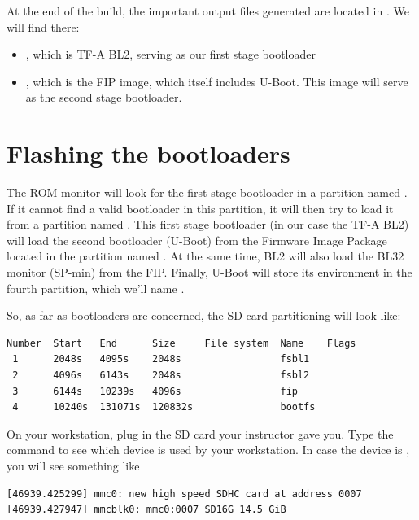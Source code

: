At the end of the build, the important output files generated are
located in . We will find there:

\begin{itemize}

\item {}, which is TF-A BL2, serving as
  our first stage bootloader

\item {}, which is the FIP image, which itself includes
  U-Boot. This image will serve as the second stage bootloader.

\end{itemize}

\section{Flashing the bootloaders}

The ROM monitor will look for the first stage bootloader in a
partition named . If it cannot find a valid bootloader in
this partition, it will then try to load it from a partition named
. This first stage bootloader (in our case the TF-A BL2)
will load the second bootloader (U-Boot) from the Firmware Image
Package located in the partition named . At the same time,
BL2 will also load the BL32 monitor (SP-min) from the FIP. Finally,
U-Boot will store its environment in the fourth partition, which we'll
name .

So, as far as bootloaders are concerned, the SD card partitioning will
look like:

\begin{verbatim}
Number  Start   End      Size     File system  Name    Flags
 1      2048s   4095s    2048s                 fsbl1
 2      4096s   6143s    2048s                 fsbl2
 3      6144s   10239s   4096s                 fip
 4      10240s  131071s  120832s               bootfs
\end{verbatim}

On your workstation, plug in the SD card your instructor gave you. Type
the  command to see which device is used by your
workstation. In case the device is , you will see
something like

\begin{verbatim}
[46939.425299] mmc0: new high speed SDHC card at address 0007
[46939.427947] mmcblk0: mmc0:0007 SD16G 14.5 GiB
\end{verbatim}

